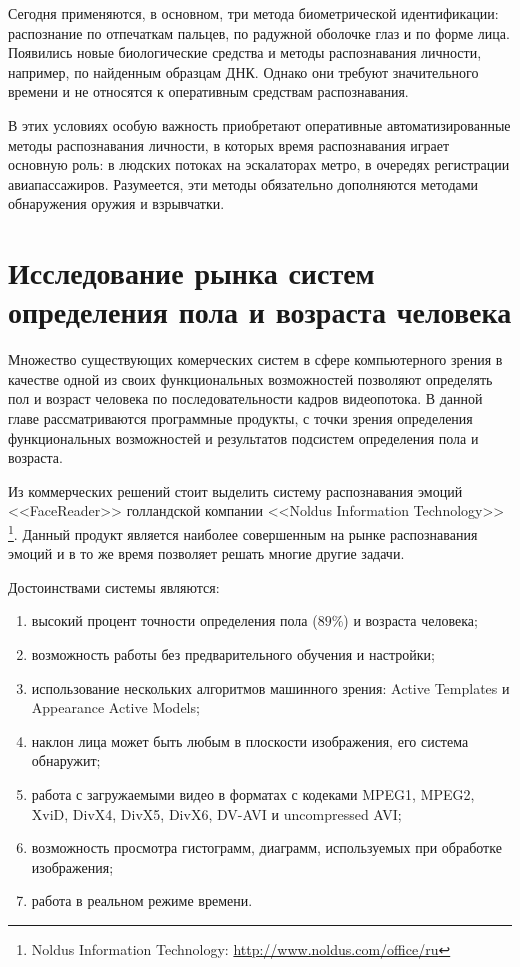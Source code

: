 Сегодня применяются, в основном, три метода биометрической идентификации:
распознание по отпечаткам пальцев, по радужной оболочке глаз и по форме лица.
Появились новые биологические средства и методы распознавания личности,
например, по найденным образцам ДНК. Однако они требуют значительного времени и
не относятся к оперативным средствам распознавания.

В этих условиях особую важность приобретают оперативные автоматизированные
методы распознавания личности, в которых время распознавания играет основную
роль: в людских потоках на эскалаторах метро, в очередях регистрации
авиапассажиров. Разумеется, эти методы обязательно дополняются методами
обнаружения оружия и взрывчатки.

\section{Исследование рынка систем определения пола и возраста человека}

Множество существующих комерческих систем в сфере компьютерного зрения в
качестве одной из своих функциональных возможностей позволяют определять пол и
возраст человека по последовательности кадров видеопотока. В данной главе
рассматриваются программные продукты, с точки зрения определения функциональных
возможностей и результатов подсистем определения пола и возраста.

Из коммерческих решений стоит выделить систему распознавания эмоций
<<FaceReader>> голландской компании <<Noldus Information Technology>>
\footnote{Noldus Information Technology: \url{http://www.noldus.com/office/ru}}.
Данный продукт является наиболее совершенным на рынке распознавания эмоций и в
то же время позволяет решать многие другие задачи.

Достоинствами системы являются:
\begin{enumerate}
 \item высокий процент точности определения пола ($89\%$) и возраста человека;
 \item возможность работы без предварительного обучения и настройки;
 \item использование нескольких алгоритмов машинного зрения: Active Templates и
Appearance Active Models;
 \item наклон лица может быть любым в плоскости изображения, его система
обнаружит;
 \item работа с загружаемыми видео в форматах с кодеками MPEG1, MPEG2,
XviD, DivX4, DivX5, DivX6, DV-AVI и uncompressed AVI;
 \item возможность просмотра гистограмм, диаграмм, используемых при обработке
изображения;
 \item работа в реальном режиме времени.
\end{enumerate}

